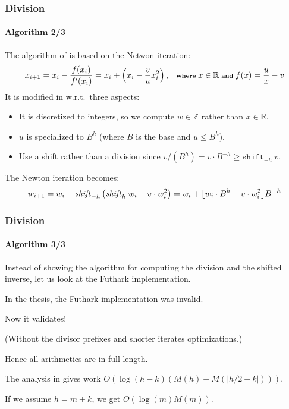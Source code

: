       
\begin{frame}[fragile]
  \frametitle{Division}
  \framesubtitle{Algorithm 2/3}
  The algorithm of \cite{watt2023efficient} is based on the Netwon iteration:\vspace*{-0.5em}
  \begin{equation}\scriptsize
  x_{i+1} = x_i - \dfrac{f(x_i)}{f'(x_i)} = x_i + \left( x_i - \dfrac{v}{u}x^2_i \right),\quad \textbf{where}~x\in \mathbb{R}~ \textbf{and}~ f(x) = \dfrac{u}{x} - v
\end{equation}\pause
It is modified in \cite{watt2023efficient} w.r.t.\ three aspects:
\begin{itemize}\footnotesize
\item It is discretized to integers, so we compute $w\in\mathbb{Z}$ rather than $x\in\mathbb{R}$.\pause
\item $u$ is specialized to $B^h$ (where $B$ is the base and $u \leq B^h$).\pause
\item Use a shift rather than a division since $v/(B^h)=v\cdot B^{-h}\geq \mathtt{shift}_{-h}~v$.
\end{itemize}\pause
The Newton iteration becomes:\vspace*{-0.5em}
\begin{equation}\scriptsize
  w_{i+1} =  w_i + \mathit{shift}_{-h}\left( \mathit{shift}_{h}~w_i - v\cdot w^2_i \right) =  w_i + \lfloor w_i\cdot B^h - v\cdot w^2_i \rfloor B^{-h}
\end{equation}
\end{frame}

\begin{frame}[fragile]
  \frametitle{Division}
  \framesubtitle{Algorithm 3/3}

  Instead of showing the algorithm for computing the division and the shifted
  inverse, let us look at the Futhark implementation.\vspace*{0.75em}\pause

  In the thesis, the Futhark implementation was {\red invalid}.

  Now it {\green validates}!

  (Without the divisor prefixes and shorter iterates optimizations.)\vspace*{0.75em}\pause

  Hence all arithmetics are in full length.

  The analysis in \cite{watt2023efficient} gives work $O(\log (h-k)(M(h)+M(|h/2 - k|)))$.

  If we assume $h=m+k$, we get $O(\log (m)M(m))$.
\end{frame}


